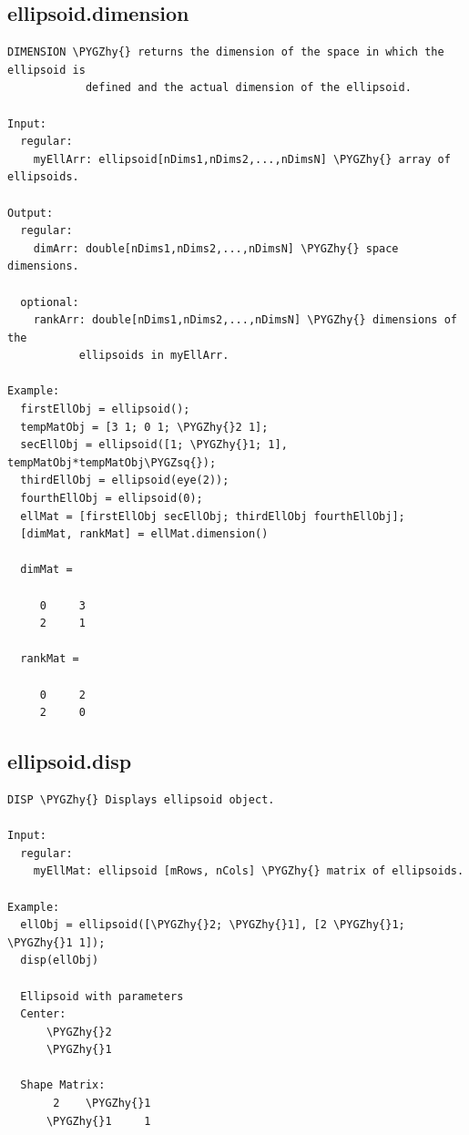 \documentclass[letterpaper,10pt,english]{sphinxmanual}
\def\PYGZhy{\char`\-}
\def\PYGZsq{\char`\'}
\begin{document}
\subsection{ellipsoid.dimension}
\label{chap_functions:ellipsoid-dimension}
\begin{Verbatim}[commandchars=\\\{\}]
DIMENSION \PYGZhy{} returns the dimension of the space in which the ellipsoid is
            defined and the actual dimension of the ellipsoid.

Input:
  regular:
    myEllArr: ellipsoid[nDims1,nDims2,...,nDimsN] \PYGZhy{} array of ellipsoids.

Output:
  regular:
    dimArr: double[nDims1,nDims2,...,nDimsN] \PYGZhy{} space dimensions.

  optional:
    rankArr: double[nDims1,nDims2,...,nDimsN] \PYGZhy{} dimensions of the
           ellipsoids in myEllArr.

Example:
  firstEllObj = ellipsoid();
  tempMatObj = [3 1; 0 1; \PYGZhy{}2 1];
  secEllObj = ellipsoid([1; \PYGZhy{}1; 1], tempMatObj*tempMatObj\PYGZsq{});
  thirdEllObj = ellipsoid(eye(2));
  fourthEllObj = ellipsoid(0);
  ellMat = [firstEllObj secEllObj; thirdEllObj fourthEllObj];
  [dimMat, rankMat] = ellMat.dimension()

  dimMat =

     0     3
     2     1

  rankMat =

     0     2
     2     0
\end{Verbatim}


\subsection{ellipsoid.disp}
\label{chap_functions:ellipsoid-disp}
\begin{Verbatim}[commandchars=\\\{\}]
DISP \PYGZhy{} Displays ellipsoid object.

Input:
  regular:
    myEllMat: ellipsoid [mRows, nCols] \PYGZhy{} matrix of ellipsoids.

Example:
  ellObj = ellipsoid([\PYGZhy{}2; \PYGZhy{}1], [2 \PYGZhy{}1; \PYGZhy{}1 1]);
  disp(ellObj)

  Ellipsoid with parameters
  Center:
      \PYGZhy{}2
      \PYGZhy{}1

  Shape Matrix:
       2    \PYGZhy{}1
      \PYGZhy{}1     1
\end{Verbatim}
\end{document}
